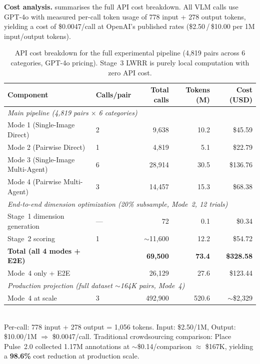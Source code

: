 \documentclass[runningheads]{llncs}
\begin{document}
\smallskip\noindent\textbf{Cost analysis.}
 summarises the full API cost breakdown.
All VLM calls use GPT-4o with measured per-call token usage of 778 input + 278 output tokens, yielding a cost of \$0.0047/call at OpenAI's published rates (\$2.50\,/\,\$10.00 per 1M input/output tokens).

\begin{table}[H]
\centering
\caption{API cost breakdown for the full experimental pipeline (4,819 pairs across 6 categories, GPT-4o pricing). Stage~3 LWRR is purely local computation with zero API cost.}
\label{tab:cost}
\small
\begin{tabular}{llrrr}
\toprule
Component & Calls/pair & Total calls & Tokens (M) & Cost (USD) \\
\midrule
\multicolumn{5}{l}{\textit{Main pipeline (4,819 pairs $\times$ 6 categories)}} \\
\quad Mode 1 (Single-Image Direct)      & 2 & 9,638  & 10.2 & \$45.59 \\
\quad Mode 2 (Pairwise Direct)          & 1 & 4,819  & 5.1 & \$22.79 \\
\quad Mode 3 (Single-Image Multi-Agent) & 6 & 28,914 & 30.5 & \$136.76 \\
\quad Mode 4 (Pairwise Multi-Agent)     & 3 & 14,457 & 15.3 & \$68.38 \\
\midrule
\multicolumn{5}{l}{\textit{End-to-end dimension optimization (20\% subsample, Mode~2, 12 trials)}} \\
\quad Stage~1 dimension generation      & --- & 72    & 0.1 & \$0.34 \\
\quad Stage~2 scoring                   & 1   & ${\sim}$11,600 & 12.2 & \$54.72 \\
\midrule
\textbf{Total (all 4 modes + E2E)}      &     & \textbf{69,500} & \textbf{73.4} & \textbf{\$328.58} \\
Mode~4 only + E2E                        &     & 26,129 & 27.6 & \$123.44 \\
\midrule
\multicolumn{5}{l}{\textit{Production projection (full dataset ${\sim}$164K pairs, Mode~4)}} \\
\quad Mode~4 at scale                   & 3 & 492,900 & 520.6 & ${\sim}$\$2,329 \\
\bottomrule
\end{tabular}
\\[4pt]
\footnotesize{Per-call: 778 input + 278 output = 1,056 tokens. Input: \$2.50/1M, Output: \$10.00/1M $\Rightarrow$ \$0.0047/call. Traditional crowdsourcing comparison: Place Pulse~2.0 collected 1.17M annotations at ${\sim}$\$0.14/comparison $\approx$ \$167K, yielding a \textbf{98.6\%} cost reduction at production scale.}
\end{table}
\end{document}
